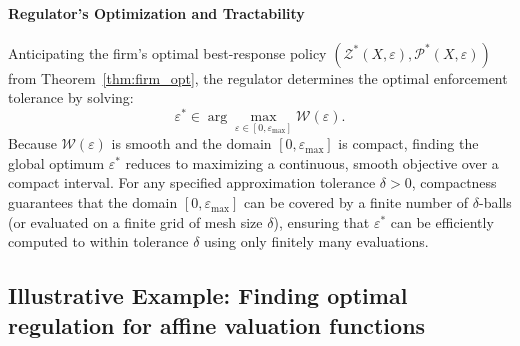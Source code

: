 \paragraph{Regulator's Optimization and Tractability}
Anticipating the firm's optimal best-response policy $(\mathcal{Z}^*(X, \varepsilon), \mathcal{P}^*(X, \varepsilon))$ from Theorem~\ref{thm:firm_opt}, the regulator determines the optimal enforcement tolerance by solving:
\begin{equation}
\label{eq:eps_star}
\varepsilon^* \in \arg\max_{\varepsilon \in [0, \varepsilon_{\max}]} \mathcal{W}(\varepsilon).
\end{equation}
Because $\mathcal{W}(\varepsilon)$ is smooth and the domain $[0, \varepsilon_{\max}]$ is compact, finding the global optimum $\varepsilon^*$ reduces to maximizing a continuous, smooth objective over a compact interval. For any specified approximation tolerance $\delta > 0$, compactness guarantees that the domain $[0, \varepsilon_{\max}]$ can be covered by a finite number of $\delta$-balls (or evaluated on a finite grid of mesh size $\delta$), ensuring that $\varepsilon^*$ can be efficiently computed to within tolerance $\delta$ using only finitely many evaluations.


\subsection{Illustrative Example: Finding optimal regulation for affine valuation functions}
\label{ssec:analytical_proof}

